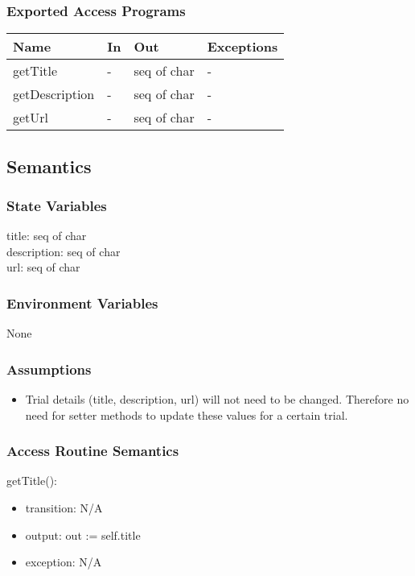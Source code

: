 \documentclass[12pt, titlepage]{article}
\begin{document}
\subsubsection{Exported Access Programs}

\begin{center}
\begin{tabular}{p{4cm} p{4cm} p{4cm} p{4cm}}
\hline
\textbf{Name} & \textbf{In} & \textbf{Out} & \textbf{Exceptions} \\
\hline
getTitle & - & seq of char & - \\
\hline
getDescription & - & seq of char & - \\
\hline
getUrl & - & seq of char & - \\
\end{tabular}
\end{center}

\subsection{Semantics}

\subsubsection{State Variables}
title: seq of char\\
description: seq of char\\
url: seq of char

\subsubsection{Environment Variables}
None

\subsubsection{Assumptions}

\begin{itemize}
  \item Trial details (title, description, url) will not need to be changed. Therefore no need for setter methods to update these values for a certain trial.
\end{itemize}

\subsubsection{Access Routine Semantics}

\noindent getTitle():
\begin{itemize}
\item transition: N/A
\item output: out := self.title
\item exception: N/A
\end{itemize}
\end{document}
